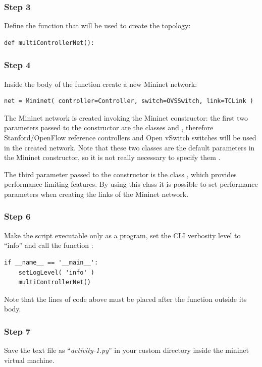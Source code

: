\subsubsection*{Step 3}
Define the function that will be used to create the topology:
\begin{lstlisting}
def multiControllerNet():
\end{lstlisting}

\subsubsection*{Step 4}
Inside the body of the function  create a new Mininet
network:
\begin{lstlisting}
net = Mininet( controller=Controller, switch=OVSSwitch, link=TCLink )
\end{lstlisting}

The Mininet network is created invoking the Mininet constructor: the first two parameters
passed to the constructor are the classes  and , therefore
Stanford/OpenFlow reference controllers and Open vSwitch switches will be used
in the created network. Note that these two classes are the default parameters in
the Mininet constructor, so it is not really necessary to specify them \parencite{ref-4}.

The third parameter passed to the constructor is the class , which provides
performance limiting features. By using this class it is possible to set performance
parameters when creating the links of the Mininet network.

\subsubsection*{Step 6}
Make the script executable only as a program, set the CLI verbosity level to ``info''
and call the function :
\begin{lstlisting}
if __name__ == '__main__':
    setLogLevel( 'info' )
    multiControllerNet()
\end{lstlisting}
Note that the lines of code above must be placed after the function 
outside its body.

\subsubsection*{Step 7}
Save the text file as ``\emph{activity-1.py}'' in your custom directory inside
the mininet virtual machine.





